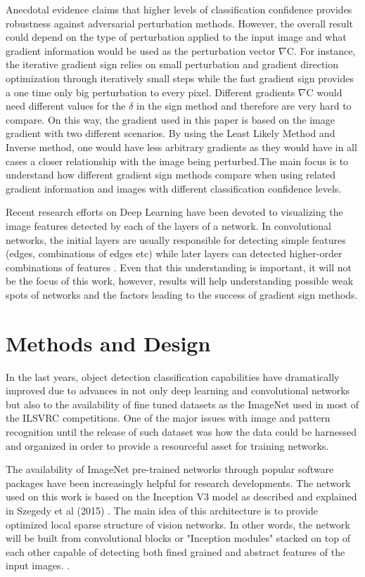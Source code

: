 \documentclass[10pt,journal,compsoc]{IEEEtran}
\begin{document}
Anecdotal evidence claims that higher levels of classification confidence provides robustness against adversarial perturbation methods. However, the overall result could depend on the type of perturbation applied to the input image and what gradient information would be used as the perturbation vector $\nabla$C. For instance, the iterative gradient sign relies on small perturbation and gradient direction optimization through iteratively small steps while the fast gradient sign provides a one time only big perturbation to every pixel. Different gradients $\nabla$C would need different values for the $\delta$ in the sign method and therefore are very hard to compare. On this way, the gradient used in this paper is based on the image gradient with two different scenarios. By using the Least Likely Method and Inverse method, one would have less arbitrary gradients as they would have in all cases a closer relationship with the image being perturbed.The main focus is to understand how different gradient sign methods compare when using related gradient information and images with different classification confidence levels.

Recent research efforts on Deep Learning have been devoted to visualizing the image features detected by each of the layers of a network. In convolutional networks, the initial layers are usually responsible for detecting simple features (edges, combinations of edges etc) while later layers can detected higher-order combinations of features \cite{yosinski2015understanding}. Even that this understanding is important, it will not be the focus of this work, however, results will help understanding possible weak spots of networks and the factors leading to the success of gradient sign methods.

\section{Methods and Design}
\label{sec:methods}
In the last years, object detection classification capabilities have dramatically improved due to advances in not only deep learning and convolutional networks but also to the availability of fine tuned datasets as the ImageNet \cite{deng2009imagenet} used in most of the ILSVRC competitions. One of the major issues with image and pattern recognition until the release of such dataset was how the data could be harnessed and organized in order to provide a resourceful asset for training networks.

The availability of ImageNet pre-trained networks through popular software packages have been increasingly helpful for research developments. The network used on this work is based on the Inception V3 model as described and explained in Szegedy et al (2015) \cite{szegedy2015going}. The main idea of this architecture is to provide optimized local sparse structure of vision networks. In other words, the network will be built from convolutional blocks or "Inception modules" stacked on top of each other capable of detecting both fined grained and abstract features of the input images. \cite{szegedy2015going}.
\end{document}
